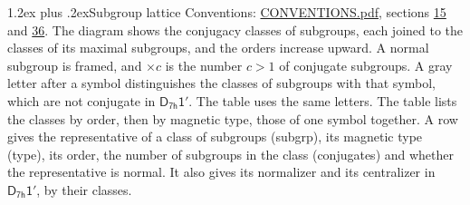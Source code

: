 \documentclass[10pt,a4paper]{article}
\makeatletter
\renewcommand\section{\@startsection{section}{1}{\z@}{-3ex plus -1ex minus -.2ex}%
  {1.2ex plus .2ex}{\normalfont\large\sffamily\bfseries\color{parttitle}}}
\numberwithin{equation}{section}
\newcommand{\grp}[1]{\mathsf{#1}}
\makeatother
\begin{document}
\section{Subgroup lattice}\label{s:subgroups}
Conventions: \href{../../CONVENTIONS.pdf}{CONVENTIONS.pdf}, sections \href{../../../rotation/CONVENTIONS.pdf\#conv.15}{15} and \href{../../CONVENTIONS.pdf\#conv.36}{36}.
The diagram shows the conjugacy classes of subgroups, each joined to the classes of its maximal subgroups, and the orders increase upward. \label{n:index.conjugates.c}\label{n:mark.conjugates}A normal subgroup is framed, and ${\times}c$ is the number $c > 1$ of conjugate subgroups. \label{n:mark.letter}A gray letter after a symbol distinguishes the classes of subgroups with that symbol, which are not conjugate in $\grp{D_{7h}1'}$. The table uses the same letters. The table lists the classes by order, then by magnetic type, those of one symbol together. \label{n:head.subgroup}\label{n:head.magnetic.type}\label{n:head.order}\label{n:head.conjugates}\label{n:head.normal}A row gives the representative of a class of subgroups (subgrp), its magnetic type (type), its order, the number of subgroups in the class (conjugates) and whether the representative is normal. \label{n:head.normalizer}\label{n:head.centralizer}It also gives its normalizer and its centralizer in $\grp{D_{7h}1'}$, by their classes. 
\end{document}

